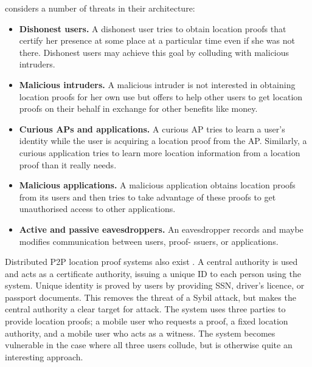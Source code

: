 \documentclass[12pt]{article}
\begin{document}
\cite{luo} considers a number of threats in their architecture:
\begin{itemize}
	\item \textbf{Dishonest users.} A dishonest user tries to obtain location proofs that certify her presence at some place at a particular time even if she was not there. Dishonest users may achieve this goal by colluding with malicious intruders.
	\item \textbf{Malicious intruders.} A malicious intruder is not interested in obtaining location proofs for her own use but offers to help other users to get location proofs on their behalf in exchange for other benefits like money.
	\item \textbf{Curious APs and applications.} A curious AP tries to learn a user’s identity while the user is acquiring a location proof from the AP. Similarly, a curious application tries to learn more location information from a location proof than it really needs.
	\item \textbf{Malicious applications.} A malicious application obtains location proofs from its users and then tries to take advantage of these proofs to get unauthorised access to other applications.
	\item \textbf{Active and passive eavesdroppers.} An eavesdropper records and maybe modifies communication between users, proof- ssuers, or applications.
\end{itemize}

Distributed P2P location proof systems also exist \cite{khan}. A central authority is used and acts as a certificate authority, issuing a unique ID to each person using the system. Unique identity is proved by users by providing SSN, driver’s licence, or passport documents. This removes the threat of a Sybil attack, but makes the central authority a clear target for attack. The system uses three parties to provide location proofs; a mobile user who requests a proof, a fixed location authority, and a mobile user who acts as a witness. The system becomes vulnerable in the case where all three users collude, but is otherwise quite an interesting approach.
\end{document}
